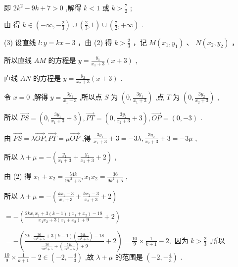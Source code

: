 \documentclass[10pt]{article}
\newcommand*\circled[1]{\tikz[baseline=(char.base)]{\node[shape=circle,draw,inner sep=1.5pt] (char) {\small #1};}}
\begin{document}
即 \(2{k}^{2} - {9k} + 7 > 0\) ,解得 \(k < 1\) 或 \(k > \frac{7}{2}\)  \circled{2} ;

由 \circled{1}  \circled{2} 得 \(k \in  \left( {-\infty , - \frac{2}{3}}\right)  \cup  \left( {\frac{2}{3},1}\right)  \cup  \left( {\frac{7}{2}, + \infty }\right)\) .

(3) 设直线 \(l : y = {kx} - 3\) ，由 (2) 得 \(k > \frac{2}{3}\) ，记 \(M\left( {{x}_{1},{y}_{1}}\right)\) 、 \(N\left( {{x}_{2},{y}_{2}}\right)\) ，

所以直线 \({AM}\) 的方程是 \(y = \frac{{y}_{1}}{{x}_{1} + 3}\left( {x + 3}\right)\) ,

直线 \({AN}\) 的方程是 \(y = \frac{{y}_{2}}{{x}_{2} + 3}\left( {x + 3}\right)\) .

令 \(x = 0\) ,解得 \(y = \frac{3{y}_{1}}{{x}_{1} + 3}\) ,所以点 \(S\) 为 \(\left( {0,\frac{3{y}_{1}}{{x}_{1} + 3}}\right)\) ,点 \(T\) 为 \(\left( {0,\frac{3{y}_{2}}{{x}_{2} + 3}}\right)\) ,

所以 \(\overrightarrow{PS} = \left( {0,\frac{3{y}_{1}}{{x}_{1} + 3} + 3}\right) ,\overrightarrow{PT} = \left( {0,\frac{3{y}_{2}}{{x}_{2} + 3} + 3}\right) ,\overrightarrow{OP} = \left( {0, - 3}\right)\) .

由 \(\overrightarrow{PS} = \lambda \overrightarrow{OP},\overrightarrow{PT} = \mu \overrightarrow{OP}\) ,得 \(\frac{3{y}_{1}}{{x}_{1} + 3} + 3 =  - {3\lambda },\frac{3{y}_{2}}{{x}_{2} + 3} + 3 =  - {3\mu }\) ,

所以 \(\lambda  + \mu  =  - \left( {\frac{{y}_{1}}{{x}_{1} + 3} + \frac{{y}_{2}}{{x}_{2} + 3} + 2}\right)\) ,

由 (2) 得 \({x}_{1} + {x}_{2} = \frac{54k}{9{k}^{2} + 5},{x}_{1}{x}_{2} = \frac{36}{9{k}^{2} + 5}\) ,

所以 \(\lambda  + \mu  =  - \left( {\frac{k{x}_{1} - 3}{{x}_{1} + 3} + \frac{k{x}_{2} - 3}{{x}_{2} + 3} + 2}\right)\)

\(=  - \left( {\frac{{2k}{x}_{1}{x}_{2} + 3\left( {k - 1}\right) \left( {{x}_{1} + {x}_{2}}\right)  - {18}}{{x}_{1}{x}_{2} + 3\left( {{x}_{1} + {x}_{2}}\right)  + 9} + 2}\right)\)

\(=  - \left( {\frac{{2k} \cdot  \frac{36}{9{k}^{2} + 5} + 3\left( {k - 1}\right) \left( \frac{54k}{9{k}^{2} + 5}\right)  - {18}}{\frac{36}{9{k}^{2} + 5} + \left( \frac{54k}{9{k}^{2} + 5}\right)  + 9} + 2}\right)  = \frac{10}{9} \times  \frac{1}{k + 1} - 2,\) 因为 \(k > \frac{2}{3}\) ,所以 \(\frac{10}{9} \times  \frac{1}{k + 1} - 2 \in  \left( {-2, - \frac{4}{3}}\right)\) ,故 \(\lambda  + \mu\) 的范围是 \(\left( {-2, - \frac{4}{3}}\right)\) .
\end{document}
